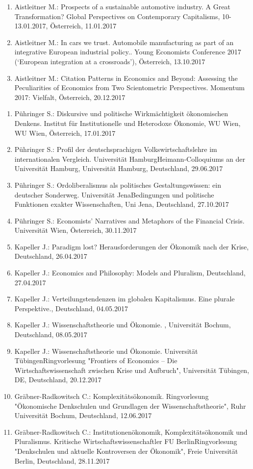 \begin{enumerate}
	\item Aistleitner M.: Prospects of a sustainable automotive industry. A Great Transformation? Global Perspectives on Contemporary Capitalisms, 10-13.01.2017, Österreich, 11.01.2017
	\item Aistleitner M.: In cars we trust. Automobile manufacturing as part of an integrative European industrial policy.. Young Economists Conference 2017 (‘European integration at a crossroads’), Österreich, 13.10.2017
	\item Aistleitner M.: Citation Patterns in Economics and Beyond: Assessing the Peculiarities of Economics from Two Scientometric Perspectives. Momentum 2017: Vielfalt, Österreich, 20.12.2017
\end{enumerate}

\begin{enumerate}
	\item Pühringer S.: Diskursive und politische Wirkmächtigkeit ökonomischen Denkens. Institut für Institutionelle und Heterodoxe Ökonomie, WU Wien, WU Wien, Österreich, 17.01.2017
	\item Pühringer S.: Profil der deutschsprachigen Volkswirtschaftslehre im internationalen Vergleich. Universität HamburgHeimann-Colloquiums an der Universität Hamburg, Universität Hamburg, Deutschland, 29.06.2017
	\item Pühringer S.: Ordoliberalismus als politisches Gestaltungswissen:  ein deutscher Sonderweg. Universität JenaBedingungen und politische Funktionen exakter Wissenschaften, Uni Jena, Deutschland, 27.10.2017
	\item Pühringer S.: Economists' Narratives and Metaphors of the Financial Crisis. Universität Wien, Österreich, 30.11.2017
	\item Kapeller J.: Paradigm lost? Herausforderungen der Ökonomik nach der Krise, Deutschland, 26.04.2017
	\item Kapeller J.: Economics and Philosophy: Models and Pluralism, Deutschland, 27.04.2017
	\item Kapeller J.: Verteilungstendenzen im globalen Kapitalismus. Eine plurale Perspektive., Deutschland, 04.05.2017
	\item Kapeller J.: Wissenschaftstheorie und Ökonomie. , Universität Bochum, Deutschland, 08.05.2017
	\item Kapeller J.: Wissenschaftstheorie und Ökonomie. Universität TübingenRingvorlesung "Frontiers of Economics – Die Wirtschaftswissenschaft zwischen Krise und Aufbruch", Universität Tübingen, DE, Deutschland, 20.12.2017
	\item Gräbner-Radkowitsch C.: Komplexitätsökonomik. Ringvorlesung "Ökonomische Denkschulen und Grundlagen der Wissenschaftstheorie", Ruhr Universität Bochum, Deutschland, 12.06.2017
	\item Gräbner-Radkowitsch C.: Institutionenökonomik, Komplexitätsökonomik und Pluralismus. Kritische Wirtschaftswissenschaftler FU BerlinRingvorlesung "Denkschulen und aktuelle Kontroversen der Ökonomik", Freie Universität Berlin, Deutschland, 28.11.2017
\end{enumerate}


